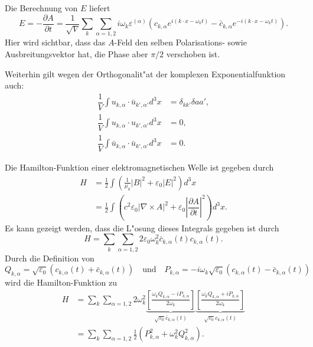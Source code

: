 \begin{refsection}
Die Berechnung von $E$ liefert
\begin{equation*}
	E = - \frac{\partial A}{\partial t} = \frac{1}{\sqrt{V}} \sum_k \sum_{\alpha=1,2} i \omega_k \varepsilon^{(\alpha)} \left(c_{k,\alpha} e^{i (k \cdot x - \omega_k t)} - \bar{c}_{k,\alpha} e^{-i(k \cdot x - \omega_k t)} \right).
\end{equation*}
Hier wird sichtbar, dass das $A$-Feld den selben Polarisations- sowie Ausbreitungsvektor hat, die Phase aber $\pi/2$ verschoben ist.

Weiterhin gilt wegen der Orthogonalit"at der komplexen Exponentialfunktion auch:
\begin{align*}
\dfrac{1}{V} \int u_{k,\alpha} \cdot \bar{u}_{k',\alpha'} d^3 x &= \delta_{kk'}\delta{aa'}, \\
\dfrac{1}{V} \int u_{k,\alpha} \cdot u_{k',\alpha'} d^3 x &= 0, \\
\dfrac{1}{V} \int \bar{u}_{k,\alpha} \cdot \bar{u}_{k',\alpha'} d^3 x &= 0.
\end{align*}

Die Hamilton-Funktion einer elektromagnetischen Welle ist gegeben durch
\begin{equation*}
\begin{split}
H &= \frac{1}{2} \int \left(\frac{1}{\mu_0}|B|^2 + \varepsilon_0|E|^2\right) d^3 x \\
	&= \frac{1}{2} \int \left(c^2 \varepsilon_0 | \nabla\times A |^2 + \varepsilon_0 \left| \dfrac{\partial A}{\partial t} \right|^2 \right) d^3 x.
\end{split}
\end{equation*}
Es kann gezeigt werden, dass die L"osung dieses Integrals gegeben ist durch
\begin{equation*}
H = \sum_k \sum_{\alpha=1,2} 2 \varepsilon_0 \omega_k^2 \bar{c}_{k,\alpha}(t) c_{k,\alpha}(t).
\end{equation*}
Durch die Definition von 
\begin{equation*}
Q_{k,\alpha} = \sqrt{\varepsilon_0} \left(c_{k,\alpha}(t) + \bar{c}_{k,\alpha}(t)\right) \quad \text{und} \quad P_{k,\alpha} = -i \omega_k \sqrt{\varepsilon_0} \left(c_{k,\alpha}(t) - \bar{c}_{k,\alpha}(t)\right)
\end{equation*}
wird die Hamilton-Funktion zu
\begin{equation} \label{fq:hamilton}
\begin{split}
H &= \sum_k \sum_{\alpha=1,2} 2 \omega_k^2 
	\underbrace{\left[ \frac{\omega_k Q_{k,\alpha} - i P_{k,\alpha}}{2 \omega_k} \right]}_{\sqrt{\varepsilon_0} \bar{c}_{k,\alpha}(t)}
	\underbrace{\left[ \frac{\omega_k Q_{k,\alpha} + i P_{k,\alpha}}{2 \omega_k} \right]}_{\sqrt{\varepsilon_0} c_{k,\alpha}(t)} \\
&= \sum_k \sum_{\alpha=1,2} \frac{1}{2} \left(P_{k,\alpha}^2 + \omega_k^2 Q_{k,\alpha}^2\right).
\end{split}
\end{equation}


\end{refsection}
